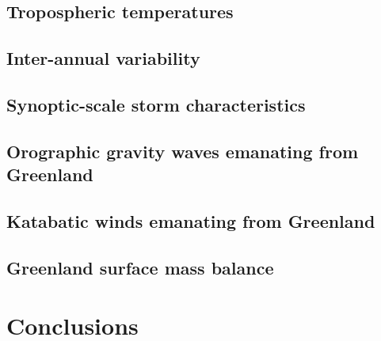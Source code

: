 \documentclass[draft]{agujournal2019}
\begin{document}
\subsection{Tropospheric temperatures}
\subsection{Inter-annual variability}
\subsection{Synoptic-scale storm characteristics}
\subsection{Orographic gravity waves emanating from Greenland}
\subsection{Katabatic winds emanating from Greenland}
\subsection{Greenland surface mass balance}

%
%
%
%

\section{Conclusions}\label{sec:conclusions}
\end{document}
